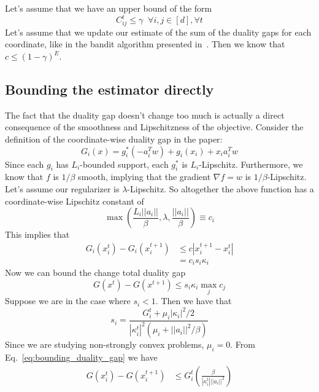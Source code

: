 \documentclass[letterpaper]{article}
\begin{document}
Let's assume that we have an upper bound of the form
\begin{equation}
C_{ij}^t \leq \gamma \;\;\forall i, j \in [d], \forall t
\end{equation}
Let's assume that we update our estimate of the sum of the duality gaps for each coordinate, like in the bandit algorithm presented in~\cite{salehi2018coordinate}. Then we know that $c \leq (1-\gamma)^E$.

\subsection{Bounding the estimator directly}
The fact that the duality gap doesn't change too much is actually a direct consequence of the smoothness and Lipschitzness of the objective. Consider the definition of the coordinate-wise duality gap in the paper:
\begin{equation}
    G_i(x) = g_i^*(-a_i^T w) + g_i(x_i) + x_i a_i^T w
\end{equation}
Since each $g_i$ has $L_i$-bounded support, each $g_i^*$ is $L_i$-Lipschitz. Furthermore, we know that $f$ is $1/\beta$ smooth, implying that the gradient $\nabla f = w$ is $1/\beta$-Lipschitz. Let's assume our regularizer is $\lambda$-Lipschitz. So altogether the above function has a coordinate-wise Lipschitz constant of 
\begin{equation}
    \max\left(\frac{L_i||a_i||}{\beta},\lambda,\frac{||a_i||}{\beta}\right)\equiv c_i
\end{equation}
This implies that
\begin{align}
    G_i(x_i^t) - G_i(x_i^{t+1}) &\leq c |x_i^{t+1}-x_i^t| \\ 
    &= c_i s_i \kappa_i
\end{align}
Now we can bound the change total duality gap
\begin{equation}
    G(x^t) - G(x^{t+1}) \leq s_i \kappa_i \max_j c_j
    \label{eq:bounding_duality_gap}
\end{equation}
Suppose we are in the case where $s_i < 1$. Then we have that
\begin{equation}
s_i = \frac{G_i^t + \mu_i |\kappa_i|^2/2}{|\kappa_i^t|^2 (\mu_i + ||a_i||^2/\beta)}
\end{equation}
Since we are studying non-strongly convex problems, $\mu_i=0$. From Eq.~\ref{eq:bounding_duality_gap} we have
\begin{align}
    G(x_i^t) - G(x_i^{t+1}) &\leq G_i^t\left(\frac{\beta}{|\kappa_i^t|||a_i||^2}\right)
\end{align}
\end{document}
